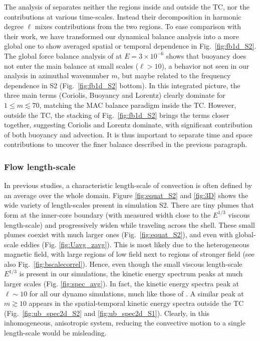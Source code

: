 \documentclass[12pt, a4paper]{article}
\begin{document}
The analysis of \cite{aubert2017} separates neither the regions inside and outside the TC, nor the contributions at various time-scales.
Instead their decomposition in harmonic degree $\ell$ mixes contributions from the two regions.
To ease comparison with their work, we have transformed our dynamical balance analysis into a more global one to show averaged spatial or temporal dependence in Fig.~\ref{fig:fb1d_S2}.
The global force balance analysis of \cite[their Fig.~2b]{aubert2017} at $E=3\times10^{-6}$ shows that buoyancy does not enter the main balance at small scales ($\ell > 10$), a behavior not seen in our analysis in azimuthal wavenumber $m$, but maybe related to the frequency dependence in S2 (Fig.~\ref{fig:fb1d_S2} bottom).
In this integrated picture, the three main terms (Coriolis, Buoyancy and Lorentz) clearly dominate for $1 \leq m \lesssim 70$, matching the MAC balance paradigm inside the TC.
However, outside the TC, the stacking of Fig.~\ref{fig:fb1d_S2} brings the terms closer together, suggesting Coriolis and Lorentz dominate, with significant contribution of both buoyancy and advection.
It is thus important to separate time and space contributions to uncover the finer balance described in the previous paragraph.


\subsubsection{Flow length-scale}
In previous studies, a characteristic length-scale of convection is often defined by an average over the whole domain.
Figure \ref{fig:equat_S2} and \ref{fig:3D} shows the wide variety of length-scales present in simulation S2.
There are tiny plumes that form at the inner-core boundary (with measured width close to the $E^{1/3}$ viscous length-scale) and progressively widen while traveling across the shell.
These small plumes coexist with much larger ones (Fig.~\ref{fig:equat_S2}), and even with global-scale eddies (Fig. \ref{fig:Uavg_zavg}).
This is most likely due to the heterogeneous magnetic field, with large regions of low field next to regions of stronger field (see also Fig.~\ref{fig:bscalecorrel}).
Hence, even though the small viscous length-scale $E^{1/3}$ is present in our simulations, the kinetic energy spectrum peaks at much larger scales (Fig. \ref{fig:spec_avg}).
In fact, the kinetic energy spectra peak at $\ell \sim 10$ for all our dynamo simulations, much like those of \cite{aubert2017}.
A similar peak at $m \gtrsim 10$ appears in the spatial-temporal kinetic energy spectra outside the TC (Fig.~\ref{fig:ub_spec2d_S2} and \ref{fig:ub_spec2d_S1}).
Clearly, in this inhomogeneous, anisotropic system, reducing the convective motion to a single length-scale would be misleading.
\end{document}
